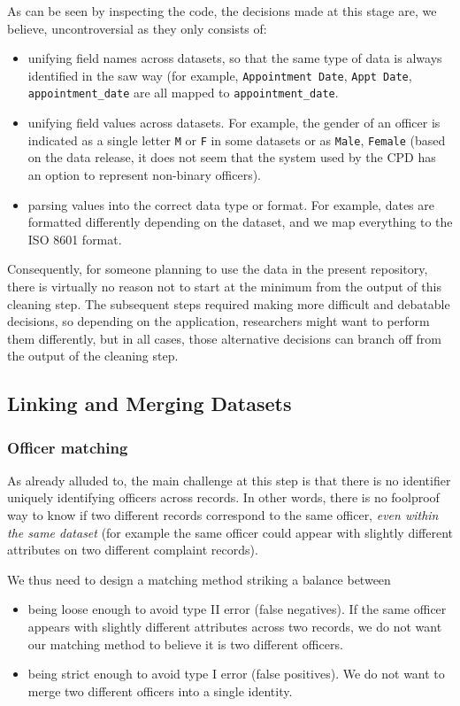 As can be seen by inspecting the code, the decisions made at this stage are, we
believe, uncontroversial as they only consists of:
\begin{itemize}
	\item unifying field names across datasets, so that the same type of data
		is always identified in the saw way (for example, \texttt{Appointment
		Date}, \texttt{Appt Date}, \texttt{appointment\_date} are all mapped to
		\texttt{appointment\_date}.
	\item unifying field values across datasets. For example, the gender of an
		officer is indicated as a single letter \texttt{M} or \texttt{F} in
		some datasets or as \texttt{Male}, \texttt{Female} (based on the data
		release, it does not seem that the system used by the CPD has an option
		to represent non-binary officers).
	\item parsing values into the correct data type or format. For example,
		dates are formatted differently depending on the dataset, and we map
		everything to the ISO 8601 format.
\end{itemize}

Consequently, for someone planning to use the data in the present repository,
there is virtually no reason not to start at the minimum from the output of
this cleaning step. The subsequent steps required making more difficult and
debatable decisions, so depending on the application, researchers might want to
perform them differently, but in all cases, those alternative decisions can
branch off from the output of the cleaning step.

\subsection{Linking and Merging Datasets}\label{sec:linking}

\subsubsection{Officer matching}

As already alluded to, the main challenge at this step is that there is no
identifier uniquely identifying officers across records. In other words, there
is no foolproof way to know if two different records correspond to the same
officer, \emph{even within the same dataset} (for example the same officer
could appear with slightly different attributes on two different complaint
records).

We thus need to design a matching method striking a balance between
\begin{itemize}
	\item being loose enough to avoid type II error (false negatives). If the
		same officer appears with slightly different attributes across two
		records, we do not want our matching method to believe it is two
		different officers.
	\item being strict enough to avoid type I error (false positives). We do
		not want to merge two different officers into a single identity.
\end{itemize}

